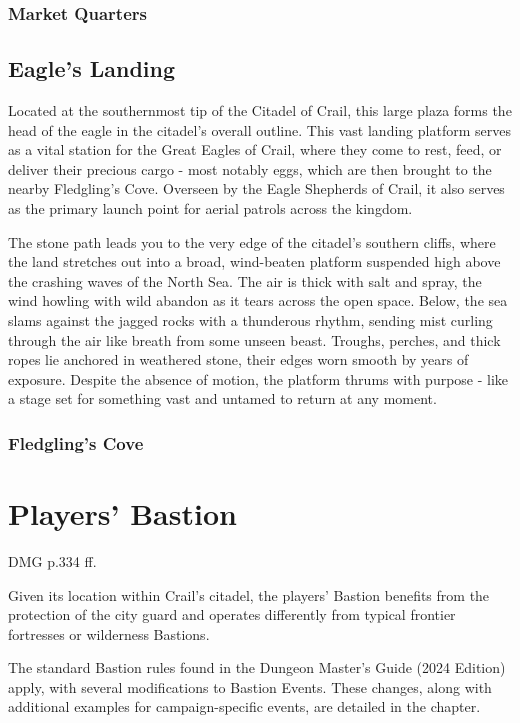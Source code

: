 \subsubsection*{ Market Quarters}
\subsection*{ Eagle's Landing}
{\entryfont Located at the southernmost tip of the Citadel of Crail, this large plaza forms the head of the eagle in the citadel's overall outline. This vast landing platform serves as a vital station for the Great Eagles of Crail, where they come to rest, feed, or deliver their precious cargo - most notably eggs, which are then brought to the nearby Fledgling's Cove. Overseen by the Eagle Shepherds of Crail, it also serves as the primary launch point for aerial patrols across the kingdom.}
\begin{DndReadAloud}
	The stone path leads you to the very edge of the citadel's southern cliffs, where the land stretches out into a broad, wind-beaten platform suspended high above the crashing waves of the North Sea. The air is thick with salt and spray, the wind howling with wild abandon as it tears across the open space. Below, the sea slams against the jagged rocks with a thunderous rhythm, sending mist curling through the air like breath from some unseen beast. Troughs, perches, and thick ropes lie anchored in weathered stone, their edges worn smooth by years of exposure. Despite the absence of motion, the platform thrums with purpose - like a stage set for something vast and untamed to return at any moment.
\end{DndReadAloud}
\subsubsection*{ Fledgling's Cove}

\section*{Players' Bastion}\label{sec:PlayersBastion}
{\entryfont DMG p.334 ff.

Given its location within Crail's citadel, the players' Bastion benefits from the protection of the city guard and operates differently from typical frontier fortresses or wilderness Bastions.

The standard Bastion rules found in the Dungeon Master's Guide (2024 Edition) apply, with several modifications to Bastion Events. These changes, along with additional examples for campaign-specific events, are detailed in the \hyperref[chapter:BastionEvents]{} chapter.}
